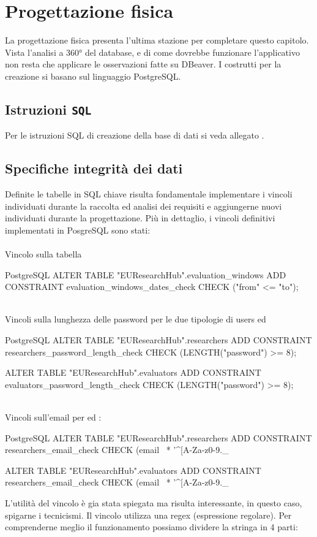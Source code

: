 \documentclass{report}
\begin{document}
\section{Progettazione fisica}
La progettazione fisica presenta l'ultima stazione per completare questo capitolo.  Vista l'analisi a 360° del database, e di come dovrebbe funzionare l'applicativo non resta che applicare le osservazioni fatte su DBeaver. I costrutti per la creazione si basano sul linguaggio PostgreSQL.
\subsection{Istruzioni \texttt{SQL}}
Per le istruzioni SQL di creazione della base di dati si veda allegato . 

\subsection{Specifiche integrità dei dati}
Definite le tabelle in SQL chiave risulta fondamentale implementare i vincoli individuati durante la raccolta ed analisi dei requisiti e aggiungerne nuovi individuati durante la progettazione.  
Più in dettaglio, i vincoli definitivi implementati in PosgreSQL sono stati:\\
\phantom{This text will be invisible}\\
Vincolo sulla tabella 
\begin{imtaCode}{PostgreSQL}
ALTER TABLE "EUResearchHub".evaluation_windows
ADD CONSTRAINT evaluation_windows_dates_check CHECK ("from" <= "to");
\end{imtaCode}
\phantom{This text will be invisible}\\
Vincoli sulla lunghezza delle password per le due tipologie di users  ed 
\begin{imtaCode}{PostgreSQL}
ALTER TABLE "EUResearchHub".researchers
ADD CONSTRAINT researchers_password_length_check CHECK (LENGTH("password") >= 8);

ALTER TABLE "EUResearchHub".evaluators
ADD CONSTRAINT evaluators_password_length_check CHECK (LENGTH("password") >= 8);
\end{imtaCode}
\phantom{This text will be invisible}\\
Vincoli sull'email per  ed :
\begin{imtaCode}{PostgreSQL}
ALTER TABLE "EUResearchHub".researchers
ADD CONSTRAINT researchers_email_check CHECK (email ~* '^[A-Za-z0-9._%

ALTER TABLE "EUResearchHub".evaluators
ADD CONSTRAINT researchers_email_check CHECK (email ~* '^[A-Za-z0-9._%
\end{imtaCode}
L'utilità del vincolo è gia stata spiegata ma risulta interessante, in questo caso, spigarne i tecnicismi. Il vincolo utilizza una regex (espressione regolare). Per comprenderne meglio il funzionamento possiamo dividere la stringa in 4 parti: 
\end{document}
